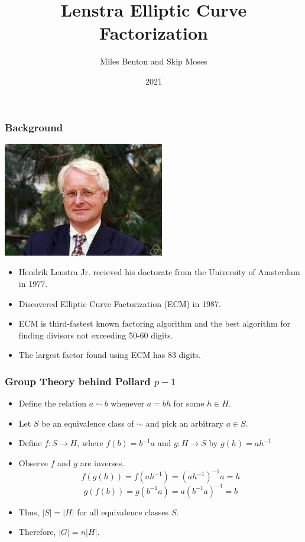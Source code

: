 \documentclass{beamer}
\title{Lenstra Elliptic Curve Factorization}
\author{Miles Benton and Skip Moses}
\institute{MATH 317}
\date{2021}
\begin{document}
\frame{\titlepage}


\begin{frame}
\frametitle{Background}


\center
\includegraphics[scale = .5]{lenstra.jpeg}

\begin{itemize}[<+->]
\item Hendrik Lenstra Jr. recieved his doctorate from the University of Amsterdam in 1977.

\item Discovered Elliptic Curve Factorization (ECM) in 1987.

\item ECM is third-fastest known factoring algorithm and the best algorithm for finding divisors not exceeding 50-60 digits.

\item The largest factor found using ECM has 83 digits.
\end{itemize}
\end{frame}

\begin{frame}
\frametitle{Group Theory behind Pollard $p-1$}



\begin{itemize}
\item<4-> Define the relation $a \sim b$ whenever $a = bh$ for some $h \in H$. 
\item<5-> Let $S$ be an equivalence class of $\sim$ and pick an arbitrary $a \in S$.
\item<6-> Define $f: S \rightarrow H$, where $f(b) = b^{-1}a$ and $g:H \rightarrow S$ by $g(h) = ah^{-1}$
\item<7-> Observe $f$ and $g$ are inverses.
$$f(g(h)) = f(ah^{-1}) = (ah^{-1})^{-1}a = h$$
$$g(f(b)) = g(b^{-1}a) = a(b^{-1}a)^{-1} = b$$
\item<7-> Thus, $\vert S \vert = \vert H \vert$ for all equivalence classes $S$.
\item<8-> Therefore, $\vert G \vert = n \vert H \vert$. 
\end{itemize}
\end{frame}
\end{document}
